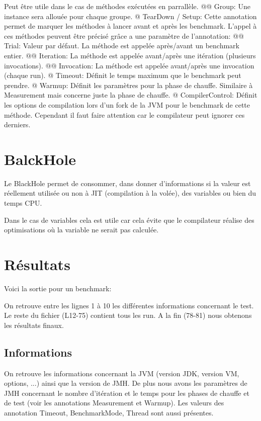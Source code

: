 \documentclass{report}
\begin{document}
\begin{easylist}[itemize]
				Peut être utile dans le cas de méthodes exécutées en parrallèle.
				@@ Group: Une instance sera allouée pour chaque groupe.
				@ TearDown / Setup: Cette annotation permet de marquer les méthodes à lancer avant et après les benchmark.
				L'appel à ces méthodes peuvent être précisé grâce a une paramètre de l'annotation:
				@@ Trial: Valeur par défaut. La méthode est appelée après/avant un benchmark entier.
				@@ Iteration: La méthode est appelée avant/après une itération (plusieurs invocations).
				@@ Invocation: La méthode est appelée avant/après une invocation (chaque run).
				@ Timeout: Définit le temps maximum que le benchmark peut prendre.
				@ Warmup: Définit les paramètres pour la phase de chauffe.
				Similaire à Measurement mais concerne juste la phase de chauffe.
				@ CompilerControl: Définit les options de compilation lors d'un fork de la JVM pour le benchmark de cette méthode.
				Cependant il faut faire attention car le compilateur peut ignorer ces derniers.
			\end{easylist}
		
		\section{BalckHole}
			Le BlackHole permet de consommer, dans donner d'informations si la valeur est réellement utilisée ou non à JIT (compilation à la volée), des variables ou bien du temps CPU.
			
			Dans le cas de variables cela est utile car cela évite que le compilateur réalise des optimisations où la variable ne serait pas calculée.
			
		\section{Résultats}
			Voici la sortie pour un benchmark:
			
			On retrouve entre les lignes 1 à 10 les différentes informations concernant le test.
			Le reste du fichier (L12-75) contient tous les run.
			A la fin (78-81) nous obtenons les résultats finaux.
			
			\subsection{Informations}
				On retrouve les informations concernant la JVM (version JDK, version VM, options, ...) ainsi que la version de JMH.
				De plus nous avons les paramètres de JMH concernant le nombre d'itération et le temps pour les phases de chauffe et de test (voir les annotations Measurement et Warmup).
				Les valeurs des annotation Timeout, BenchmarkMode, Thread sont aussi présentes.
			
\end{document}
